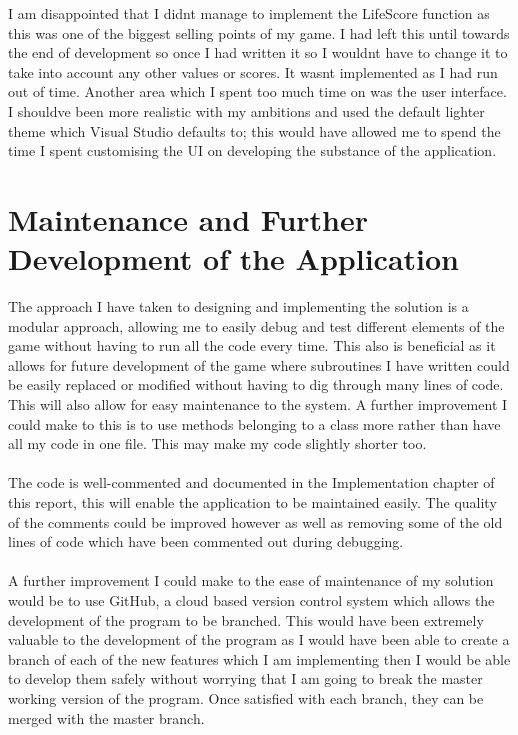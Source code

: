 I am disappointed that I didn\textquotesingle t manage to implement the LifeScore function as this was one of the biggest selling points of my game. I had left this until towards the end of development so once I had written it so I wouldn\textquotesingle t have to change it to take into account any other values or scores. It wasn\textquotesingle t implemented as I had run out of time. Another area which I spent too much time on was the user interface. I should\textquotesingle ve been more realistic with my ambitions and used the default lighter theme which Visual Studio defaults to; this would have allowed me to spend the time I spent customising the UI on developing the substance of the application.

\section{Maintenance and Further Development of the Application}
The approach I have taken to designing and implementing the solution is a modular approach, allowing me to easily debug and test different elements of the game without having to run all the code every time. This also is beneficial as it allows for future development of the game where subroutines I have written could be easily replaced or modified without having to dig through many lines of code. This will also allow for easy maintenance to the system. A further improvement I could make to this is to use methods belonging to a class more rather than have all my code in one file. This may make my code slightly shorter too.\\ \\
The code is well-commented and documented in the Implementation chapter of this report, this will enable the application to be maintained easily. The quality of the comments could be improved however as well as removing some of the old lines of code which have been commented out during debugging. \\ \\
A further improvement I could make to the ease of maintenance of my solution would be to use GitHub, a cloud based version control system which allows the development of the program to be branched. This would have been extremely valuable to the development of the program as I would have been able to create a branch of each of the new features which I am implementing then I would be able to develop them safely without worrying that I am going to break the master working version of the program. Once satisfied with each branch, they can be merged with the master branch.


